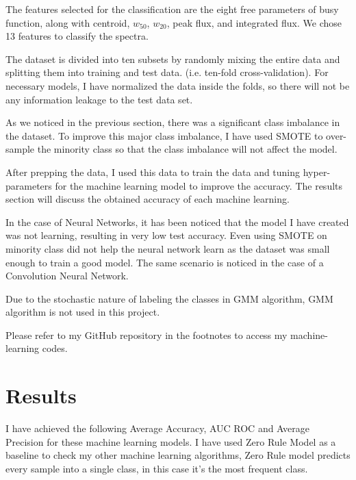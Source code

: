 \documentclass[10pt,twocolumn,letterpaper]{article}
\begin{document}
The features selected for the classification are the eight free parameters of busy function, along with centroid, $w_{50}$, $w_{20}$, peak flux, and integrated flux. We chose 13 features to classify the spectra.

The dataset is divided into ten subsets by randomly mixing the entire data and splitting them into training and test data. (i.e. ten-fold cross-validation). For necessary models, I have normalized the data inside the folds, so there will not be any information leakage to the test data set.

As we noticed in the previous section, there was a significant class imbalance in the dataset. To improve this major class imbalance, I have used SMOTE to over-sample the minority class so that the class imbalance will not affect the model.

After prepping the data, I used this data to train the data and tuning hyper-parameters for the machine learning model to improve the accuracy. The results section will discuss the obtained accuracy of each machine learning.

In the case of Neural Networks, it has been noticed that the model I have created was not learning, resulting in very low test accuracy. Even using SMOTE on minority class did not help the neural network learn as the dataset was small enough to train a good model. The same scenario is noticed in the case of a Convolution Neural Network.

Due to the stochastic nature of labeling the classes in GMM algorithm, GMM algorithm is not used in this project.

Please refer to my GitHub repository in the footnotes to access my machine-learning codes.\footnotemark[1]

\section{Results}
I have achieved the following Average Accuracy, AUC ROC and Average Precision for these machine learning models. I have used Zero Rule Model as a baseline to check my other machine learning algorithms, Zero Rule model predicts every sample into a single class, in this case it's the most frequent class.
\end{document}
